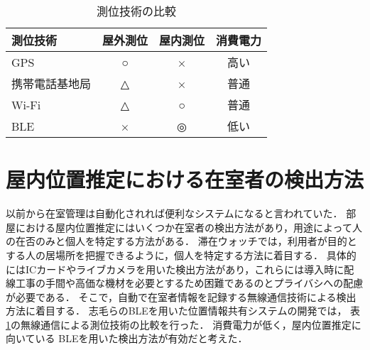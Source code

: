 \begin{table}[htb]
  \begin{center}
    \caption{測位技術の比較}
    \label{tb:positioning}
    \begin{tabular}{|l|c|c|c|} \hline
      測位技術       & 屋外測位 & 屋内測位 & 消費電力 \\ \hline \hline
      GPS            & ○        & ×        & 高い     \\
      携帯電話基地局 & △        & ×        & 普通     \\
      Wi-Fi          & △        & ○        & 普通     \\
      BLE            & ×        & ◎        & 低い     \\\hline
    \end{tabular}
  \end{center}
\end{table}





\section{屋内位置推定における在室者の検出方法}\label{2.1}
以前から在室管理は自動化されれば便利なシステムになると言われていた\cite{twitter}．
部屋における屋内位置推定にはいくつか在室者の検出方法があり，用途によって人の在否のみと個人を特定する方法がある．
滞在ウォッチでは，利用者が目的とする人の居場所を把握できるように，個人を特定する方法に着目する．
具体的にはICカードやライブカメラを用いた検出方法があり，これらには導入時に配線工事の手間や高価な機材を必要とするため困難であるのとプライバシへの配慮が必要である．
そこで，自動で在室者情報を記録する無線通信技術による検出方法に着目する．
志毛らのBLEを用いた位置情報共有システムの開発\cite{communication}では，
表\ref{tb:positioning}の無線通信による測位技術の比較を行った．
消費電力が低く，屋内位置推定に向いている BLEを用いた検出方法が有効だと考えた．